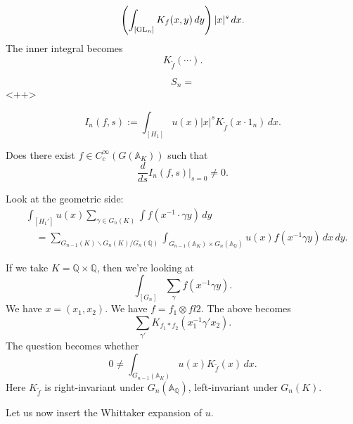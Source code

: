 \documentclass[reqno]{amsart} 
\begin{document}
\begin{equation*}
\left( \int_{[\operatorname{GL}_n]} K_f(x, y) \, d y \right) \lvert x \rvert^s \, d x.
\end{equation*}
The inner integral becomes
\begin{equation*}
K_{\tilde{f}}(\dotsb).
\end{equation*}

\begin{equation*}
S_n = 
\end{equation*}<++>


\begin{equation*}
I_n(f, s) := \int_{[H_1]} u(x) \lvert x \rvert^s K_{\tilde{f}}(x \cdot 1_n) \, d x.
\end{equation*}
\begin{question}\label{question:cnfg5j0r2o}
  Does there exist $f \in C_c^\infty(G(\mathbb{A}_K))$ such that
  \begin{equation*}
    \frac{d}{d s}
    I_n(f, s)|_{s=0} \neq 0.
  \end{equation*}
\end{question}
Look at the geometric side:
\begin{align*}
  &\int_{[H_1']} u(x) \sum_{\gamma \in G_n(K)} \int f(x^{-1} \cdot \gamma y) \,d y
  \\
  &\quad
    =
    \sum_{G_{n - 1}(K) \backslash G_n(K) / G_n(\mathbb{Q})}
    \int_{G_{n-1}(\mathbb{A}_K) \times G_n(\mathbb{A}_{\mathbb{Q}})} u(x) f(x^{-1} \gamma y) \, d x \, d y.
\end{align*}

If we take $K = \mathbb{Q} \times \mathbb{Q}$, then we're looking at
\begin{equation*}
\int_{[G_n]} \sum_\gamma f(x^{-1} \gamma y).
\end{equation*}
We have $x =(x_1, x_2)$.  We have $f = f_1 \otimes fl2$.  The above becomes
\begin{equation*}
\sum_{\gamma '} K_{f_1 \ast f_2}(x_1^{-1} \gamma ' x_2).
\end{equation*}
The question becomes whether
\begin{equation*}
0 \neq \int_{G_{n - 1}(\mathbb{A}_K)} u(x) K_{\tilde{f}}(x) \,d x.
\end{equation*}
Here $K_{\tilde{f}}$ is right-invariant under $G_n(\mathbb{A}_{\mathbb{Q}})$, left-invariant under $G_n(K)$.

Let us now insert the Whittaker expansion of $u$.
\end{document}
